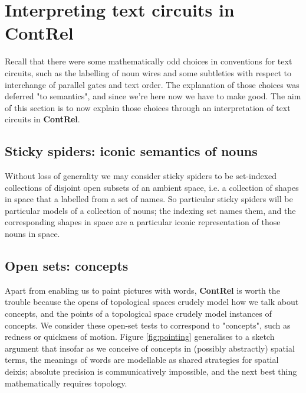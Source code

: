 \section{Interpreting text circuits in \textbf{ContRel}}

Recall that there were some mathematically odd choices in conventions for text circuits, such as the labelling of noun wires and some subtleties with respect to interchange of parallel gates and text order. The explanation of those choices was deferred "to semantics", and since we're here now we have to make good. The aim of this section is to now explain those choices through an interpretation of text circuits in \textbf{ContRel}.

\subsection{Sticky spiders: iconic semantics of nouns}
Without loss of generality we may consider sticky spiders to be set-indexed collections of disjoint open subsets of an ambient space, i.e. a collection of shapes in space that a labelled from a set of names. So particular sticky spiders will be particular models of a collection of nouns; the indexing set names them, and the corresponding shapes in space are a particular iconic representation of those nouns in space.

\subsection{Open sets: concepts}

Apart from enabling us to paint pictures with words, \textbf{ContRel} is worth the trouble because the opens of topological spaces crudely model how we talk about concepts, and the points of a topological space crudely model instances of concepts. We consider these open-set tests to correspond to "concepts", such as redness or quickness of motion. Figure \ref{fig:pointing} generalises to a sketch argument that insofar as we conceive of concepts in (possibly abstractly) spatial terms, the meanings of words are modellable as shared strategies for spatial deixis; absolute precision is communicatively impossible, and the next best thing mathematically requires topology.

